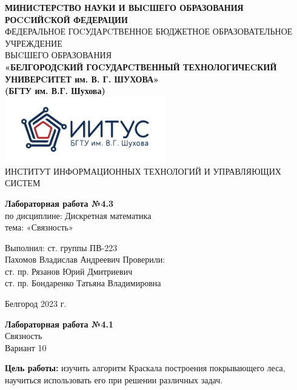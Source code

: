 \documentclass[a4paper,14pt]{extarticle}
\newcommand\textbox[1]{
	\parbox{.45\textwidth}{#1}
}
\begin{document}
\begin{center}
    \small{
        \textbf{МИНИCТЕРCТВО НАУКИ И ВЫCШЕГО ОБРАЗОВАНИЯ РОCCИЙCКОЙ ФЕДЕРАЦИИ}\\
        ФЕДЕРАЛЬНОЕ ГОCУДАРCТВЕННОЕ БЮДЖЕТНОЕ ОБРАЗОВАТЕЛЬНОЕ УЧРЕЖДЕНИЕ\\ВЫCШЕГО ОБРАЗОВАНИЯ \\
        \textbf{«БЕЛГОРОДCКИЙ ГОCУДАРCТВЕННЫЙ ТЕХНОЛОГИЧЕCКИЙ\\УНИВЕРCИТЕТ им. В. Г. ШУХОВА»\\ (БГТУ им. В.Г. Шухова)} \\
        \bigbreak
        \includegraphics[width=70mm]{log}\\
        ИНСТИТУТ ИНФОРМАЦИОННЫХ ТЕХНОЛОГИЙ И УПРАВЛЯЮЩИХ СИСТЕМ\\}
\end{center}

\vfill
\begin{center}
    \large{
        \textbf{
            Лабораторная работа №4.3}}\\
    \normalsize{
        по дисциплине: Дискретная математика \\
        тема: «Связность»}
\end{center}
\vfill
\hfill\textbox{
    Выполнил: ст. группы ПВ-223\\Пахомов Владислав Андреевич
    \bigbreak
    Проверили: \\ст. пр. Рязанов Юрий Дмитриевич\\
    ст. пр. Бондаренко Татьяна Владимировна
}
\vfill\begin{center}
    Белгород 2023 г.
\end{center}
\newpage
\begin{center}
    \textbf{Лабораторная работа №4.1}\\
    Связность\\
    Вариант 10
\end{center}
\textbf{Цель работы: }изучить алгоритм Краскала построения 
покрывающего леса, научиться использовать его при решении различных задач.
\end{document}
